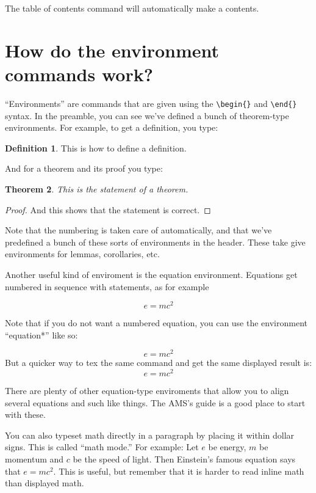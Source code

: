 \documentclass[psamsfonts]{amsart}
\newtheorem{thm}{Theorem}[section]
\theoremstyle{definition}
\newtheorem{defn}[thm]{Definition}
\theoremstyle{remark}
\numberwithin{equation}{section}
\begin{document}
The table of contents command will automatically make a contents.

\section{How do the environment commands work?}

``Environments'' are commands that are given using the \verb|\begin{}|
  and \verb|\end{}| syntax. In the preamble, you can see we've defined
  a bunch of theorem-type environments.  For example, to get a definition, 
you type:

\begin{defn}  This is how to define a definition.
\end{defn}

And for a theorem and its proof you type:

\begin{thm}
This is the statement of a theorem.
\end{thm}
\begin{proof}
And this shows that the statement is correct.
\end{proof}

Note that the numbering is taken care of automatically, and that we've predefined a bunch of these sorts of environments in the header.  These take give environments for  lemmas, corollaries, etc. 

Another useful kind of enviroment is the equation environment.  Equations
get numbered in sequence with statements, as for example

\begin{equation}  e = mc^2
\end{equation}

Note that if you do not want a numbered equation, you can use the
environment ``equation*''
 like so:

\begin{equation*}
e=mc^2
\end{equation*}
But a quicker way to tex the same command and get the same displayed result is:
\[  e=mc^2 \]

There are plenty of other equation-type enviroments that allow you to
align several equations and such like things. The AMS's guide \cite{amsshort} is a
good place to start with these.

You can also typeset math directly in a paragraph by placing it within
dollar signs.  This is called ``math mode.''  For example: Let $e$
be energy, $m$ be momentum and $c$ be the speed of light.  Then
Einstein's famous equation says that $e=mc^2$.  This is useful, but
remember that it is harder to read inline math than displayed math. 
\end{document}
